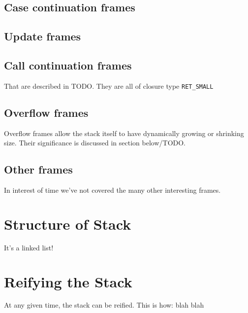 \subsection{Case continuation frames}

\subsection{Update frames}

\subsection{Call continuation frames}

That are described in TODO. %
They are all of closure type \texttt{RET\_SMALL}

\subsection{Overflow frames}

Overflow frames allow the stack itself to have dynamically growing or
shrinking size. Their significance is discussed in section below/TODO.

\subsection{Other frames}

In interest of time we've not covered the many other interesting frames.

\section{Structure of Stack}

It's a linked list! 

\section{Reifying the Stack}

At any given time, the stack can be reified. This is how: blah blah
